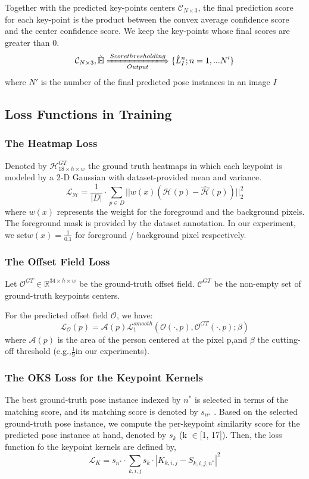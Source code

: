 \documentclass[11pt]{article}
\begin{document}
Together with the predicted key-points centers $\mathcal{C}_{N\times3}$, the final prediction score for each key-point is the product between the convex average confidence score and the center confidence score. We keep the key-points whose final scores are greater than 0.
$${\mathcal{C}_{N\times 3}, \tilde{\mathbb{H}}}\xLongrightarrow[Output]{Score thresholding}\{\hat{L}_I^n;n=1,...N'\}$$
where $N'$ is the number of the final predicted pose instances in an image $I$
\subsection{Loss Functions in Training}
\subsubsection{The Heatmap Loss}
Denoted by $\mathcal{H}^{GT}_{18\times h\times w}$ the ground truth heatmaps in which each keypoint is modeled by a 2-D Gaussian with dataset-provided mean and variance.
$$\mathcal{L}_\mathcal{H} = \frac{1}{|D|}\cdot\sum_{p\in D}||w(x)(\mathcal{H}(p)-\hat{\mathcal{H}}(p))||^2_2$$
where $w(x)$ represents the weight for the foreground and
the background pixels. The foreground mask is provided by
the dataset annotation. In our experiment, we set$w(x) = \frac{1}{0.1}$ for foreground / background pixel respectively.

\subsubsection{The Offset Field Loss}
Let $\mathcal{O}^{GT}\in \mathbb{R}^{34\times h\times w}$ be the ground-truth offset field. $\mathcal{C}^{GT}$ be the non-empty set of ground-truth keypoints centers.

For the predicted offset field $\mathcal{O}$, we have:
$$\mathcal{L}_\mathcal{O}(p) = \mathcal{A}(p)\mathcal{L}_1^{smooth}(\mathcal{O}(\cdot,p),\mathcal{O}^{GT}(\cdot,p);\beta)$$
where $\mathcal{A}(p)$ is the area of the person centered at the pixel p,and $\beta$ the cutting-off threshold (e.g.,$\frac{1}{9}$in our experiments).
\subsubsection{The OKS Loss for the Keypoint Kernels}
The best ground-truth pose instance indexed by $n^*$
is selected in terms of the matching score, and its
matching score is denoted by $s_{n^∗}$ . Based on the selected ground-truth pose instance, we compute the per-keypoint similarity score for the predicted pose instance at hand, denoted by $s_k$ (k $\in$[1, 17]). Then, the loss function fo the keypoint kernels are defined by,
$$\mathcal{L}_K = s_{n^*}\cdot \sum_{k,i,j}s_k\cdot|K_{k,i,j}-S_{k,i,j,n^*}|^2$$
\end{document}
